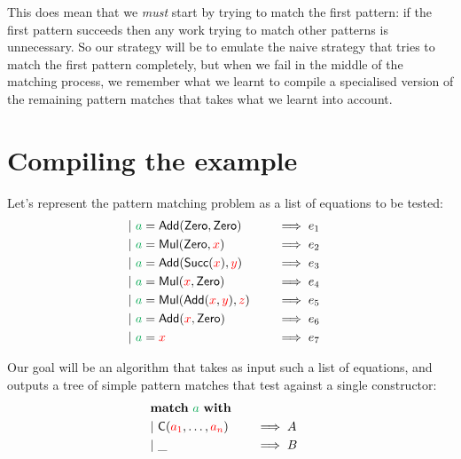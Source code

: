 \documentclass[a4paper, 11pt]{article}
\theoremstyle{definition}
\begin{document}
This does mean that we \emph{must} start by trying to match the first pattern: if the first pattern succeeds then any work trying to match other patterns is unnecessary. So our strategy will be to emulate the naive strategy that tries to match the first pattern completely, but when we fail in the middle of the matching process, we remember what we learnt to compile a specialised version of the remaining pattern matches that takes what we learnt into account.

\section{Compiling the example}

Let's represent the pattern matching problem as a list of equations to be tested:
\begin{alignat*}{4}
\clause{\ba = \Add(\Zero, \Zero)}{e_1} \\
\clause{\ba = \Mul(\Zero, \fvar{x})}{e_2} \\
\clause{\ba = \Add(\Succ(\fvar x), \fvar y)}{e_3} \\
\clause{\ba = \Mul(\fvar x, \Zero)}{e_4} \\
\clause{\ba = \Mul(\Add(\fvar x, \fvar y), \fvar z)}{e_5} \\
\clause{\ba = \Add(\fvar x, \Zero)}{e_6} \\
\clause{\ba = \fvar x}{e_7} \\
\end{alignat*}

Our goal will be an algorithm that takes as input such a list of equations, and outputs a tree of simple pattern matches that test against a single constructor:
\begin{alignat*}{4}
  \matchwith{\ba} \\
  \clause{\C(\fvar{a_1}, \dots, \fvar{a_n})}{A} \\
  \clause{\_}{B}
\end{alignat*}
\end{document}
